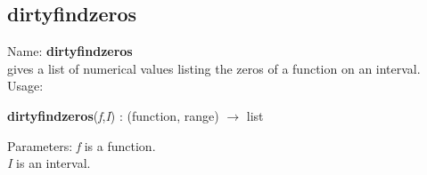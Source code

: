 \subsection{ dirtyfindzeros }
\noindent Name: \textbf{dirtyfindzeros}\\
gives a list of numerical values listing the zeros of a function on an interval.\\

\noindent Usage: 
\begin{center}
\textbf{dirtyfindzeros}(\emph{f},\emph{I}) : (\textsf{function}, \textsf{range}) $\rightarrow$ \textsf{list}\\
\end{center}
Parameters: 
\emph{f} is a function.\\
\emph{I} is an interval.\\

